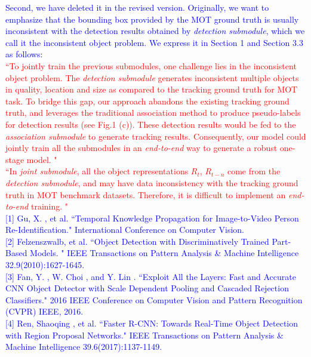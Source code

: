 \documentclass[12pt,journal,onecolumn]{IEEEtran}
\begin{document}
\textcolor{blue}{
Second, we have deleted it in the revised version. Originally, we want to emphasize that the bounding box provided by the MOT ground truth is usually inconsistent with the detection results obtained by \emph{detection submodule}, which we call it the inconsistent object problem.
We express it in Section 1 and Section 3.3 as follows: \\
}
\textcolor{red}{
``To jointly train the previous submodules, one challenge lies in the inconsistent object problem.
The \emph{detection submodule} generates inconsistent multiple objects in quality, location and size as compared to the tracking ground truth for MOT task. 
To bridge this gap, our approach abandons the existing tracking ground truth,
and leverages the traditional association method to produce pseudo-labels for detection results (see Fig.1 (c)). 
These detection results would be fed to the \emph{association submodule} to generate tracking results. 
Consequently, our model could jointly train all the submodules in an \emph{end-to-end} way to generate a robust one-stage model. "
} \\
\textcolor{red}{
``In \emph{joint submodule}, all the object representations $R_t$, $R_{t-n}$ come from the \emph{detection submodule}, and may have data inconsistency with the tracking ground truth in MOT benchmark datasets.
Therefore, it is difficult to implement an \emph{end-to-end} training. "
}
\\
\textcolor{blue}{
[1] Gu, X. , et al. ``Temporal Knowledge Propagation for Image-to-Video Person Re-Identification." International Conference on Computer Vision.
} \\
\textcolor{blue}{[2] Felzenszwalb, et al. ``Object Detection with Discriminatively Trained Part-Based Models. " IEEE Transactions on Pattern Analysis \& Machine Intelligence 32.9(2010):1627-1645.} \\
\textcolor{blue}{[3] Fan, Y. , W. Choi , and Y. Lin . ``Exploit All the Layers: Fast and Accurate CNN Object Detector with Scale Dependent Pooling and Cascaded Rejection Classifiers." 2016 IEEE Conference on Computer Vision and Pattern Recognition (CVPR) IEEE, 2016.
} \\
\textcolor{blue}{[4] Ren, Shaoqing , et al. ``Faster R-CNN: Towards Real-Time Object Detection with Region Proposal Networks." IEEE Transactions on Pattern Analysis \& Machine Intelligence 39.6(2017):1137-1149.
}
\vspace{8pt} 
\\
\\
\end{document}
